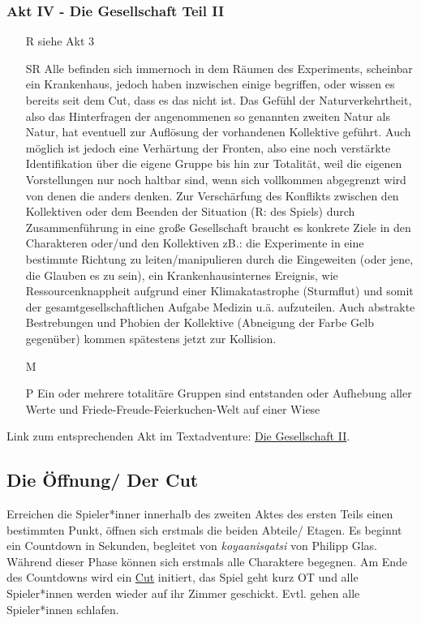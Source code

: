 \documentclass[a4paper, 12pt]{scrartcl}
\begin{document}
    \subsubsection{Akt IV - Die Gesellschaft Teil II}
    \begin{itemize} 
    \item[R]siehe Akt 3
    \item[SR] Alle befinden sich immernoch in dem Räumen des Experiments, scheinbar ein Krankenhaus, jedoch haben inzwischen einige begriffen, oder wissen es bereits seit dem Cut, dass es das nicht ist. Das Gefühl der Naturverkehrtheit, also das Hinterfragen der angenommenen so genannten zweiten Natur als Natur, hat eventuell zur Auflösung der vorhandenen Kollektive geführt. Auch möglich ist jedoch eine Verhärtung der Fronten, also eine noch verstärkte Identifikation über die eigene Gruppe bis hin zur Totalität, weil die eigenen Vorstellungen nur noch haltbar sind, wenn sich vollkommen abgegrenzt wird von denen die anders denken. Zur Verschärfung des Konflikts zwischen den Kollektiven oder dem Beenden der Situation (R: des Spiels) durch Zusammenführung in eine große Gesellschaft braucht es konkrete Ziele in den Charakteren oder/und den Kollektiven zB.: die Experimente in eine bestimmte Richtung zu leiten/manipulieren durch die Eingeweiten (oder jene, die Glauben es zu sein), ein Krankenhausinternes Ereignis, wie Ressourcenknappheit aufgrund einer Klimakatastrophe (Sturmflut) und somit der \glqq gesamtgesellschaftlichen \grqq{} Aufgabe Medizin u.ä. aufzuteilen. Auch abstrakte Bestrebungen und Phobien der Kollektive (Abneigung der Farbe Gelb gegenüber) kommen spätestens jetzt zur Kollision. 
    \item[M] 
    \item[P]Ein oder mehrere totalitäre Gruppen sind entstanden oder Aufhebung aller Werte und Friede-Freude-Feierkuchen-Welt auf einer Wiese
    \end{itemize}
    
    Link zum entsprechenden Akt im Textadventure: \hyperref[die-gesellschaft2]{Die Gesellschaft II}.
    
    
    \subsection{Die Öffnung/ Der Cut} \label{die-öffnung}
    Erreichen die Spieler*inner innerhalb des zweiten Aktes des ersten Teils einen bestimmten Punkt, öffnen sich erstmals die beiden Abteile/ Etagen. 
    Es beginnt ein Countdown in Sekunden, begleitet von \textit{koyaanisqatsi} von Philipp Glas. 
    Während dieser Phase können sich erstmals alle Charaktere begegnen. 
    Am Ende des Countdowns wird ein \hyperref[cut]{Cut} initiert, das Spiel geht kurz OT und alle Spieler*innen werden wieder auf ihr Zimmer geschickt. 
    Evtl. gehen alle Spieler*innen schlafen.  
\end{document}
